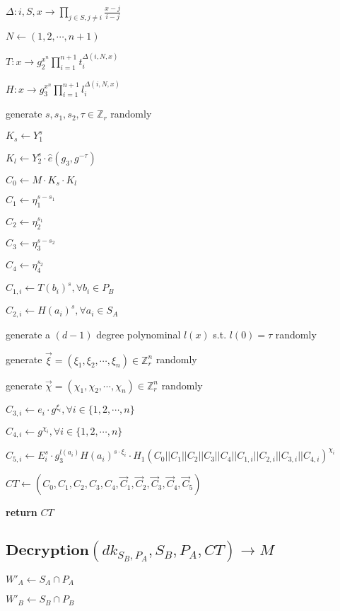 \documentclass[a4paper]{article}
\begin{document}
$\Delta: i, S, x \rightarrow \prod\limits_{j \in S, j \neq i} \frac{x - j}{i - j}$

$N \gets (1, 2, \cdots, n + 1)$

$T: x \rightarrow g_2^{x^n} \prod\limits_{i = 1}^{n + 1} t_i^{\Delta(i, N, x)}$

$H: x \rightarrow g_3^{x^n} \prod\limits_{i = 1}^{n + 1} l_i^{\Delta(i, N, x)}$

generate $s, s_1, s_2, \tau \in \mathbb{Z}_r$ randomly

$K_s \gets Y_1^s$

$K_l \gets Y_2^s \cdot \hat{e}(g_3, g^{-\tau})$

$C_0 \gets M \cdot K_s \cdot K_l$

$C_1 \gets \eta_1^{s - s_1}$

$C_2 \gets \eta_2^{s_1}$

$C_3 \gets \eta_3^{s - s_2}$

$C_4 \gets \eta_4^{s_2}$

$C_{1, i} \gets T(b_i)^s, \forall b_i \in P_B$

$C_{2, i} \gets H(a_i)^s, \forall a_i \in S_A$

generate a $(d - 1)$ degree polynominal $l(x)$ s.t. $l(0) = \tau$ randomly

generate $\vec{\xi} = (\xi_1, \xi_2, \cdots, \xi_n) \in \mathbb{Z}_r^n$ randomly

generate $\vec{\chi} = (\chi_1, \chi_2, \cdots, \chi_n) \in \mathbb{Z}_r^n$ randomly

$C_{3, i} \gets e_i \cdot g^{\xi_i}, \forall i \in \{1, 2, \cdots, n\}$

$C_{4, i} \gets g^{\chi_i}, \forall i \in \{1, 2, \cdots, n\}$

$C_{5, i} \gets E_i^s \cdot g_3^{l(a_i)} H(a_i)^{s \cdot \xi_i} \cdot H_1(C_0 || C_1 || C_2 || C_3 || C_4 || C_{1, i} || C_{2, i} || C_{3, i} || C_{4, i})^{\chi_i}$

$\textit{CT} \gets (C_0, C_1, C_2, C_3, C_4, \vec{C}_1, \vec{C}_2, \vec{C}_3, \vec{C}_4, \vec{C}_5)$

\textbf{return} $\textit{CT}$

\subsection{$\textbf{Decryption}(\textit{dk}_{S_B, P_A}, S_B, P_A, \textit{CT}) \rightarrow M$}

$W'_A \gets S_A \cap P_A$

$W'_B \gets S_B \cap P_B$
\end{document}
